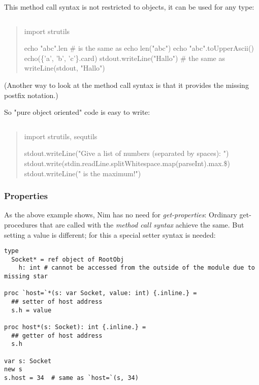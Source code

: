 This method call syntax is not restricted to objects, it can be used for
any type:

\begin{verbatim}
\end{verbatim}

\begin{quote}
import strutils

echo "abc".len \# is the same as echo len("abc") echo
"abc".toUpperAscii() echo(\{'a', 'b', 'c'\}.card)
stdout.writeLine("Hallo") \# the same as writeLine(stdout, "Hallo")
\end{quote}

(Another way to look at the method call syntax is that it provides the
missing postfix notation.)

So "pure object oriented" code is easy to write:

\begin{verbatim}
\end{verbatim}

\begin{quote}
import strutils, sequtils

stdout.writeLine("Give a list of numbers (separated by spaces): ")
stdout.write(stdin.readLine.splitWhitespace.map(parseInt).max.{\$})
stdout.writeLine(" is the maximum!")
\end{quote}

\hypertarget{properties}{%
\subsubsection{Properties}\label{properties}}

As the above example shows, Nim has no need for \emph{get-properties}:
Ordinary get-procedures that are called with the \emph{method call
syntax} achieve the same. But setting a value is different; for this a
special setter syntax is needed:

\begin{verbatim}
type
  Socket* = ref object of RootObj
    h: int # cannot be accessed from the outside of the module due to missing star

proc `host=`*(s: var Socket, value: int) {.inline.} =
  ## setter of host address
  s.h = value

proc host*(s: Socket): int {.inline.} =
  ## getter of host address
  s.h

var s: Socket
new s
s.host = 34  # same as `host=`(s, 34)
\end{verbatim}

